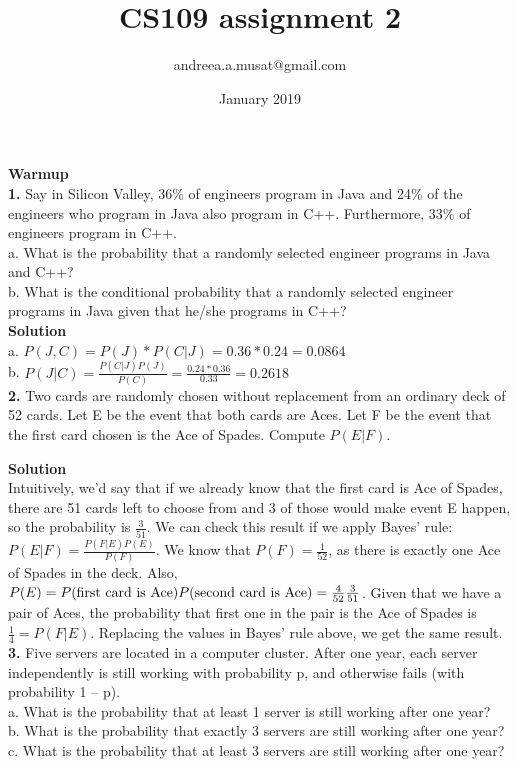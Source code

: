 \documentclass[10pt,a4paper,oneside,draft]{report}
\title{CS109 assignment 2}
\author{andreea.a.musat@gmail.com}
\date{January 2019}
\begin{document}
\maketitle

\textbf{Warmup} \\

\textbf{1.} Say in Silicon Valley, 36\% of engineers program in Java and 24\% of the engineers who
program in Java also program in C++. Furthermore, 33\% of engineers program in C++. \\
a. What is the probability that a randomly selected engineer programs in Java and C++? \\
b. What is the conditional probability that a randomly selected engineer programs in Java
given that he/she programs in C++? \\

\textbf{Solution} \\

a. $P(J, C) = P(J) * P(C|J) = 0.36 * 0.24 = 0.0864$ \\

b. $P(J|C) = \frac{ {P(C|J) P(J)} }{P(C)} = \frac{ {0.24 * 0.36} }{0.33} = 0.2618$ \\

\textbf{2.} Two cards are randomly chosen without replacement from an ordinary deck of 52 cards. Let E be the event that both cards are Aces. Let F be the event that the first card chosen is the Ace of Spades. Compute $P(E|F)$.

\textbf{Solution} \\

Intuitively, we'd say that if we already know that the first card is Ace of Spades, there are 51 cards left to choose from and 3 of those would make event E happen, so the probability is $\frac{3}{51}$. We can check this result if we apply Bayes' rule: $P(E|F) = \frac{ {P(F|E) P(E)} } {P(F)}$. We know that $P(F) = \frac{1}{52}$, as there is exactly one Ace of Spades in the deck. Also, $P(E) = P(\textnormal{first card is Ace}) P(\textnormal{second card is Ace}) = \frac{4}{52} \frac{3}{51}$. Given that we have a pair of Aces, the probability that first one in the pair is the Ace of Spades is $\frac{1}{4} = P(F|E)$. Replacing the values in Bayes' rule above, we get the same result. \\

\textbf{3.} Five servers are located in a computer cluster. After one year, each server independently is still working with probability p, and otherwise fails (with probability 1 – p). \\
a. What is the probability that at least 1 server is still working after one year? \\
b. What is the probability that exactly 3 servers are still working after one year? \\
c. What is the probability that at least 3 servers are still working after one year? \\
\end{document}
